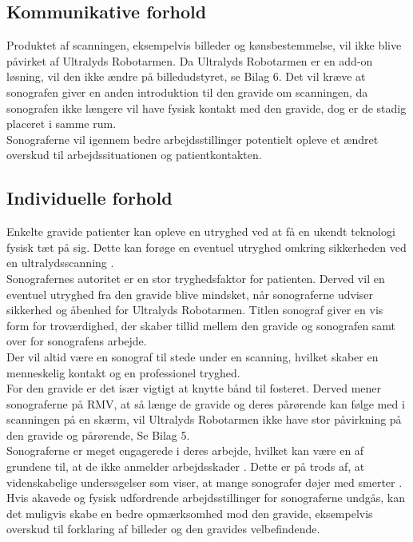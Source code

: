 \subsection{Kommunikative forhold}
Produktet af scanningen, eksempelvis billeder og kønsbestemmelse, vil ikke blive påvirket af Ultralyds Robotarmen. Da Ultralyds Robotarmen er en add-on løsning, vil den ikke ændre på billedudstyret, se Bilag 6. 
Det vil kræve at sonografen giver en anden introduktion til den gravide om scanningen, da sonografen ikke længere vil have fysisk kontakt med den gravide, dog er de stadig placeret i samme rum.  \\
Sonograferne vil igennem bedre arbejdsstillinger potentielt opleve et ændret overskud til arbejdssituationen og patientkontakten.  

\subsection{Individuelle forhold}
Enkelte gravide patienter kan opleve en utryghed ved at få en ukendt teknologi fysisk tæt på sig. Dette kan forøge en eventuel utryghed omkring sikkerheden ved en ultralydsscanning \cite{29}. \\
Sonografernes autoritet er en stor tryghedsfaktor for patienten. Derved vil en eventuel utryghed fra den gravide blive mindsket, når sonograferne udviser sikkerhed og åbenhed for Ultralyds Robotarmen. Titlen sonograf giver en vis form for troværdighed, der skaber tillid mellem den gravide og sonografen samt over for sonografens arbejde.\\
Der vil altid være en sonograf til stede under en scanning, hvilket skaber en menneskelig kontakt og en professionel tryghed.\\
For den gravide er det især vigtigt at knytte bånd til fosteret. Derved mener sonograferne på RMV, at så længe de gravide og deres pårørende kan følge med i scanningen på en skærm, vil Ultralyds Robotarmen ikke have stor påvirkning på den gravide og pårørende, Se Bilag 5. \\  
Sonograferne er meget engagerede i deres arbejde, hvilket kan være en af grundene til, at de ikke anmelder arbejdsskader \cite{1}\cite{24}. Dette er på trods af, at videnskabelige undersøgelser som viser, at mange sonografer døjer med smerter \cite{24}\cite{32}\cite{36}. 
Hvis akavede og fysisk udfordrende arbejdsstillinger for sonograferne undgås, kan det muligvis skabe en bedre opmærksomhed mod den gravide, eksempelvis overskud til forklaring af billeder og den gravides velbefindende. 
 
